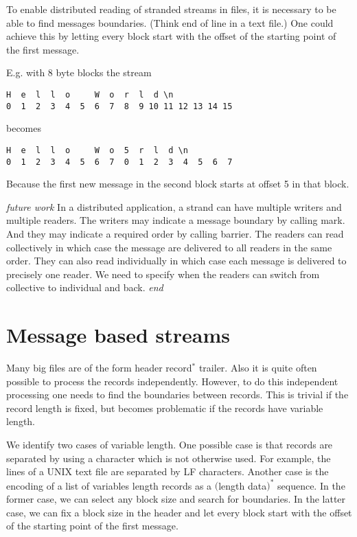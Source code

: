 \documentclass{article}
\begin{document}
\bigskip

To enable distributed reading of stranded streams in files, it is necessary to
be able to find messages boundaries. (Think end of line in a text file.)
One could achieve this by letting every
block start with the offset of the starting point of the first message.

E.g. with 8 byte blocks the stream
\begin{verbatim}
H  e  l  l  o     W  o  r  l  d \n
0  1  2  3  4  5  6  7  8  9 10 11 12 13 14 15
\end{verbatim}
becomes
\begin{verbatim}
H  e  l  l  o     W  o  5  r  l  d \n
0  1  2  3  4  5  6  7  0  1  2  3  4  5  6  7
\end{verbatim}
Because the first new message in the second block starts at offset 5 in that block.

\bigskip

{\em future work} In a distributed application, a strand can have multiple writers and multiple readers.
The writers may indicate a message boundary by calling mark. And they may indicate
a required order by calling barrier. The readers can read collectively in which case the message
are delivered to all readers in the same order. They can also read individually in which case
each message is delivered to precisely one reader. We need to specify when the readers
can switch from collective to individual and back. {\em end}

\section{Message based streams}

Many big files are of the form header record${}^*$ trailer.
Also it is quite often possible to process the records independently.
However, to do this independent processing one needs to find the
boundaries between records. This is trivial if the record length is fixed, but
becomes problematic if the records have variable length.

We identify two cases of variable length. One possible case is that records are separated
by using a character which is not otherwise used. For example, the lines of a UNIX text file
are separated by LF characters. Another case is the encoding of a list of variables length
records as a $($length data$)^*$ sequence. In the former case, we can select any block size
and search for boundaries. In the latter case, we can fix a block size in the header
and let every block start with the offset of the starting point of the first message.
\end{document}
